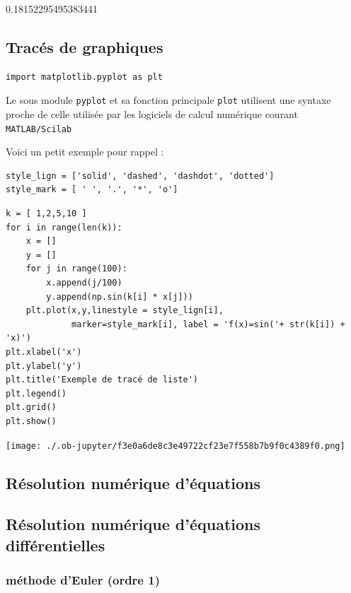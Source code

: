 \documentclass[11pt]{article}
\begin{document}
0.18152295495383441


\subsection{Tracés de graphiques}
\label{sec:orgf83e85d}

\begin{verbatim}
import matplotlib.pyplot as plt
\end{verbatim}

Le sous module \texttt{pyplot} et sa fonction principale \texttt{plot} utilisent une syntaxe proche de celle utilisée par les logiciels de calcul numérique courant \texttt{MATLAB/Scilab} 

Voici un petit exemple pour rappel : 

\begin{verbatim}
style_lign = ['solid', 'dashed', 'dashdot', 'dotted']
style_mark = [ ' ', '.', '*', 'o']
\end{verbatim}

\begin{verbatim}
k = [ 1,2,5,10 ]
for i in range(len(k)):
    x = []
    y = []
    for j in range(100):
        x.append(j/100)
        y.append(np.sin(k[i] * x[j]))
    plt.plot(x,y,linestyle = style_lign[i],
             marker=style_mark[i], label = 'f(x)=sin('+ str(k[i]) + 'x)')
plt.xlabel('x')
plt.ylabel('y')
plt.title('Exemple de tracé de liste')
plt.legend()
plt.grid()
plt.show()
\end{verbatim}

\begin{center}
\texttt{[image: ./.ob-jupyter/f3e0a6de8c3e49722cf23e7f558b7b9f0c4389f0.png]}
\end{center}


\subsection{Résolution numérique d'équations}
\label{sec:org9820965}


\subsection{Résolution numérique d'équations différentielles}
\label{sec:orgdd25748}

\subsubsection{méthode d'Euler (ordre 1)}
\label{sec:org18413cc}
\end{document}
